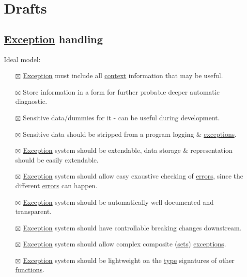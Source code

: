 \documentclass[a4paper,14pt,oneside]{book}
\begin{document}
\part{Drafts}
\label{sec:org4f8f38a}

\chapter{\hyperref[org3882403]{Exception} handling}
\label{sec:orgb633e38}

Ideal model:\\

\begin{itemize}
\item[{$\boxtimes$}] \hyperref[org3882403]{Exception} must include all \hyperref[orgbaab0e5]{context} information that may be useful.\\
\item[{$\boxtimes$}] Store information in a form for further probable deeper automatic diagnostic.\\
\item[{$\boxtimes$}] Sensitive data/dummies for it - can be useful during development.\\
\item[{$\boxtimes$}] Sensitive data should be stripped from a program logging \& \hyperref[org99ba80b]{exceptions}.\\
\item[{$\boxtimes$}] \hyperref[org3882403]{Exception} system should be extendable, data storage \& representation should be easily extendable.\\
\item[{$\boxtimes$}] \hyperref[org3882403]{Exception} system should allow easy exaustive checking of \hyperref[org13e4be2]{errors}, since the different \hyperref[org13e4be2]{errors} can happen.\\
\item[{$\boxtimes$}] \hyperref[org3882403]{Exception} system should be automatically well-documented and transparent.\\
\item[{$\boxtimes$}] \hyperref[org3882403]{Exception} system should have controllable breaking changes downstream.\\
\item[{$\boxtimes$}] \hyperref[org3882403]{Exception} system should allow complex composite (\hyperref[org05b305d]{sets}) \hyperref[org99ba80b]{exceptions}.\\
\item[{$\boxtimes$}] \hyperref[org3882403]{Exception} system should be lightweight on the \hyperref[org38dea24]{type} signatures of other \hyperref[org69a4fa1]{functions}.\\

\end{itemize}
\end{document}

